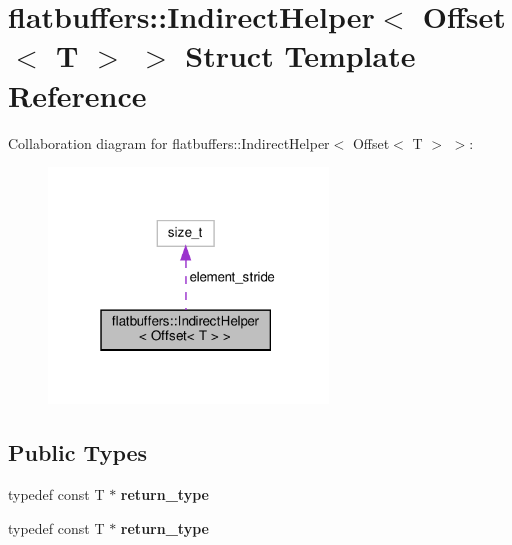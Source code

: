 \hypertarget{structflatbuffers_1_1IndirectHelper_3_01Offset_3_01T_01_4_01_4}{}\section{flatbuffers\+:\+:Indirect\+Helper$<$ Offset$<$ T $>$ $>$ Struct Template Reference}
\label{structflatbuffers_1_1IndirectHelper_3_01Offset_3_01T_01_4_01_4}


Collaboration diagram for flatbuffers\+:\+:Indirect\+Helper$<$ Offset$<$ T $>$ $>$\+:
\nopagebreak
\begin{figure}[H]
\begin{center}
\leavevmode
\includegraphics[width=211pt]{structflatbuffers_1_1IndirectHelper_3_01Offset_3_01T_01_4_01_4__coll__graph}
\end{center}
\end{figure}
\subsection*{Public Types}
\begin{DoxyCompactItemize}
\item 
\mbox{\label{structflatbuffers_1_1IndirectHelper_3_01Offset_3_01T_01_4_01_4_a3ce92eecc47213b4d808785a38add468}} 
typedef const T $\ast$ {\bfseries return\+\_\+type}
\item 
\mbox{\label{structflatbuffers_1_1IndirectHelper_3_01Offset_3_01T_01_4_01_4_a3ce92eecc47213b4d808785a38add468}} 
typedef const T $\ast$ {\bfseries return\+\_\+type}
\end{DoxyCompactItemize}
